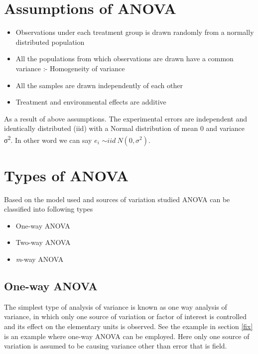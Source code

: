 \documentclass[
]{book}
\providecommand{\tightlist}{%
  \setlength{\itemsep}{0pt}\setlength{\parskip}{0pt}}
\begin{document}
\hypertarget{assumptions-of-anova}{%
\section{Assumptions of ANOVA}\label{assumptions-of-anova}}

\begin{itemize}
\item
  Observations under each treatment group is drawn randomly from a normally distributed population
\item
  All the populations from which observations are drawn have a common variance :- Homogeneity of variance
\item
  All the samples are drawn independently of each other
\item
  Treatment and environmental effects are additive
\end{itemize}

As a result of above assumptions. The experimental errors are independent and identically distributed (iid) with a Normal distribution of mean 0 and variance σ\textsuperscript{2}. In other word we can say \(e_{i}\) \(\sim iid\ N(0,\sigma^{2})\).

\hypertarget{types-of-anova}{%
\section{Types of ANOVA}\label{types-of-anova}}

Based on the model used and sources of variation studied ANOVA can be classified into following types

\begin{itemize}
\tightlist
\item
  One-way ANOVA\\
\item
  Two-way ANOVA\\
\item
  \emph{m}-way ANOVA
\end{itemize}

\hypertarget{one-way-anova}{%
\subsection{One-way ANOVA}\label{one-way-anova}}

The simplest type of analysis of variance is known as one way analysis of variance, in which only one source of variation or factor of interest is controlled and its effect on the elementary units is observed. See the example in section \ref{fix} is an example where one-way ANOVA can be employed. Here only one source of variation is assumed to be causing variance other than error that is field.
\end{document}
